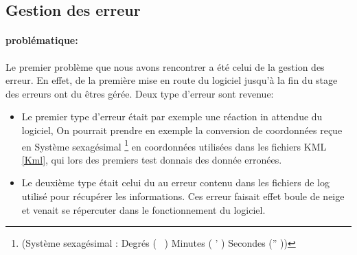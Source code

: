     \subsection{Gestion des erreur}
            \paragraph{problématique:}
Le premier problème que nous avons rencontrer a été celui de la gestion des erreur. En effet, de la première mise en route du logiciel jusqu'à la fin du stage des erreurs ont du êtres gérée. Deux type d'erreur sont revenue:
\begin{itemize}
    \item Le premier type d'erreur était par exemple une réaction in attendue du logiciel, On pourrait prendre en exemple la conversion de coordonnées reçue en Système sexagésimal \footnote{(Système sexagésimal : Degrés ( \degres\ ) Minutes ( ' ) Secondes ('' ))} en coordonnées utilisées dans les fichiers KML \vref{Kml}, qui lors des premiers test donnais des donnée erronées.
    \item Le deuxième type était celui du au erreur contenu dans les fichiers de log utilisé pour récupérer les informations. Ces erreur faisait effet boule de neige et venait se répercuter dans le fonctionnement du logiciel.
\end{itemize}

